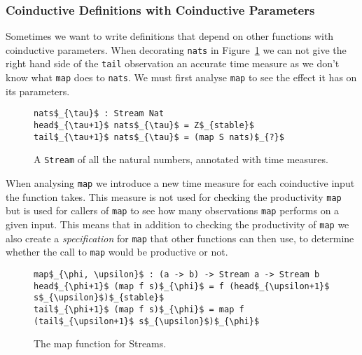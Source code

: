 \subsubsection{Coinductive Definitions with Coinductive Parameters}

Sometimes we want to write definitions that depend on other functions with coinductive parameters. When decorating \texttt{nats} in Figure~\ref{fig:nats_productivity} we can not give the right hand side of the \texttt{tail} observation an accurate time measure as we don't know what \texttt{map} does to \texttt{nats}. We must first analyse \texttt{map} to see the effect it has on its parameters.

\begin{figure}
\begin{Verbatim}[commandchars=\\\{\},codes={\catcode`$=3\catcode`_=8}]
nats$_{\tau}$ : Stream Nat
head$_{\tau+1}$ nats$_{\tau}$ = Z$_{stable}$
tail$_{\tau+1}$ nats$_{\tau}$ = (map S nats)$_{?}$
\end{Verbatim}
\caption{A \texttt{Stream} of all the natural numbers, annotated with time measures.}
\label{fig:nats_productivity}
\end{figure}

When analysing \texttt{map} we introduce a new time measure for each coinductive input the function takes. This measure is not used for checking the productivity \texttt{map} but is used for callers of \texttt{map} to see how many observations \texttt{map} performs on a given input. This means that in addition to checking the productivity of \texttt{map} we also create a \textit{specification} for \texttt{map} that other functions can then use, to determine whether the call to \texttt{map} would be productive or not.

\begin{figure}
\begin{Verbatim}[commandchars=\\\{\},codes={\catcode`$=3\catcode`_=8}]
map$_{\phi, \upsilon}$ : (a -> b) -> Stream a -> Stream b
head$_{\phi+1}$ (map f s)$_{\phi}$ = f (head$_{\upsilon+1}$ s$_{\upsilon}$)$_{stable}$
tail$_{\phi+1}$ (map f s)$_{\phi}$ = map f (tail$_{\upsilon+1}$ s$_{\upsilon}$)$_{\phi}$
\end{Verbatim}
\caption{The map function for Streams.}
\label{fig:map}
\end{figure}

